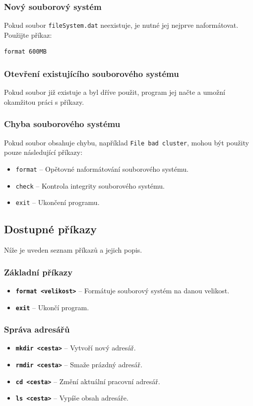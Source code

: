 \documentclass[12pt, a4paper]{article}
\begin{document}
\subsubsection{Nový souborový systém}
Pokud soubor \texttt{fileSystem.dat} neexistuje, je nutné jej nejprve naformátovat. Použijte příkaz:
\begin{verbatim}
format 600MB
\end{verbatim}

\subsubsection{Otevření existujícího souborového systému}
Pokud soubor již existuje a byl dříve použit, program jej načte a umožní okamžitou práci s příkazy.

\subsubsection{Chyba souborového systému}
Pokud soubor obsahuje chybu, například \texttt{File bad cluster}, mohou být použity pouze následující příkazy:
\begin{itemize}
    \item \texttt{format} – Opětovné naformátování souborového systému.
    \item \texttt{check} – Kontrola integrity souborového systému.
    \item \texttt{exit} – Ukončení programu.
\end{itemize}

\subsection{Dostupné příkazy}
Níže je uveden seznam příkazů a jejich popis.

\subsubsection{Základní příkazy}
\begin{itemize}
    \item \textbf{\texttt{format <velikost>}} – Formátuje souborový systém na danou velikost.
    \item \textbf{\texttt{exit}} – Ukončí program.
\end{itemize}

\subsubsection{Správa adresářů}
\begin{itemize}
    \item \textbf{\texttt{mkdir <cesta>}} – Vytvoří nový adresář.
    \item \textbf{\texttt{rmdir <cesta>}} – Smaže prázdný adresář.
    \item \textbf{\texttt{cd <cesta>}} – Změní aktuální pracovní adresář.
    \item \textbf{\texttt{ls <cesta>}} – Vypíše obsah adresáře.
\end{itemize}
\end{document}
